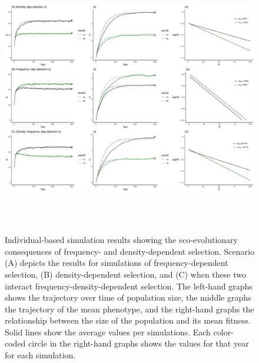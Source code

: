 \documentclass{article}
\begin{document}
\begin{figure}[h] 
	\centering
	\includegraphics[width=16cm, height=12cm]{Figures/Fig4.pdf}
	\caption{Individual-based simulation results showing the eco-evolutionary consequences of frequency- and density-dependent selection. Scenario (A) depicts the results for simulations of frequency-dependent selection, (B) density-dependent selection, and (C) when these two interact frequency-density-dependent selection. The left-hand graphs shows the trajectory over time of population size, the middle graphs the trajectory of the mean phenotype, and the right-hand graphs the relationship between the size of the population and its mean fitness. Solid lines show the average values per simulations. Each color-coded circle in the right-hand graphs shows the values for that year for each simulation.} 
	\label{fig:sim3}
\end{figure}
\end{document}
